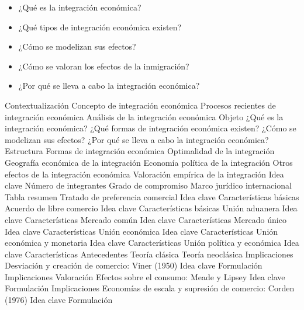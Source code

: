 \documentclass{nuevotema}
\begin{document}
\ideaclave

\begin{itemize}
	\item ¿Qué es la integración económica?
	\item ¿Qué tipos de integración económica existen?
	\item ¿Cómo se modelizan sus efectos?
	\item ¿Cómo se valoran los efectos de la inmigración?
	\item ¿Por qué se lleva a cabo la integración económica?
\end{itemize}

\esquemacorto

\begin{esquema}[enumerate]
	\1[] 
		\2 Contextualización
			\3 Concepto de integración económica
			\3 Procesos recientes de integración económica
			\3 Análisis de la integración económica
		\2 Objeto
			\3 ¿Qué es la integración económica?
			\3 ¿Qué formas de integración económica existen?
			\3 ¿Cómo se modelizan sus efectos?
			\3 ¿Por qué se lleva a cabo la integración económica?
		\2 Estructura
			\3 Formas de integración económica
			\3 Optimalidad de la integración
			\3 Geografía económica de la integración
			\3 Economía política de la integración
			\3 Otros efectos de la integración económica
			\3 Valoración empírica de la integración
	\1 
		\2 Idea clave
			\3 Número de integrantes
			\3 Grado de compromiso
			\3 Marco jurídico internacional
			\3 Tabla resumen
		\2 Tratado de preferencia comercial
			\3 Idea clave
			\3 Características básicas
		\2 Acuerdo de libre comercio
			\3 Idea clave
			\3 Características básicas
		\2 Unión aduanera
			\3 Idea clave
			\3 Características
		\2 Mercado común
			\3 Idea clave
			\3 Características
		\2 Mercado único
			\3 Idea clave
			\3 Características
		\2 Unión económica
			\3 Idea clave
			\3 Características
		\2 Unión económica y monetaria
			\3 Idea clave
			\3 Características
		\2 Unión política y económica
			\3 Idea clave
			\3 Características
	\1 
		\2 Antecedentes
			\3 Teoría clásica
			\3 Teoría neoclásica
			\3 Implicaciones
		\2 Desviación y creación de comercio: Viner (1950)
			\3 Idea clave
			\3 Formulación
			\3 Implicaciones
			\3 Valoración
		\2 Efectos sobre el consumo: Meade y Lipsey
			\3 Idea clave
			\3 Formulación
			\3 Implicaciones
		\2 Economías de escala y supresión de comercio: Corden (1976)
			\3 Idea clave
			\3 Formulación

\end{esquema}
\end{document}
